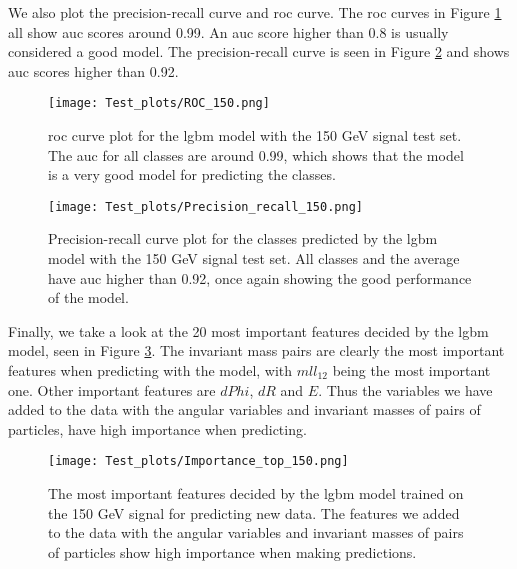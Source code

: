 \documentclass[a4paper, american, 12pt]{report}
\begin{document}
	We also plot the precision-recall curve and \acrshort{roc} curve. The \acrshort{roc} curves in Figure \ref{fig:ROCTest_150} all show \acrshort{auc} scores around 0.99. An \acrshort{auc} score higher than 0.8 is usually considered a good model. The precision-recall curve is seen in Figure \ref{fig:PrecisionRecallTest_150} and shows \acrshort{auc} scores higher than 0.92.
	\begin{figure}[h!tb]
		\centering\texttt{[image: Test\_plots/ROC\_150.png]}
		\caption[Test set \acrshort{roc} plot for the \acrshort{lgbm} model trained on the 150 GeV signal.]{\acrshort{roc} curve plot for the \acrshort{lgbm} model with the 150 GeV signal test set. The \acrshort{auc} for all classes are around 0.99, which shows that the model is a very good model for predicting the classes. \label{fig:ROCTest_150}}
	\end{figure}
	\begin{figure}[h!tb]
		\centering\texttt{[image: Test\_plots/Precision\_recall\_150.png]}
		\caption[Test set precision-recall plot for the \acrshort{lgbm} model trained on the 150 GeV signal.]{Precision-recall curve plot for the classes predicted by the \acrshort{lgbm} model with the 150 GeV signal test set. All classes and the average have \acrshort{auc} higher than 0.92, once again showing the good performance of the model. \label{fig:PrecisionRecallTest_150}}
	\end{figure}
	
	Finally, we take a look at the 20 most important features decided by the \acrshort{lgbm} model, seen in Figure \ref{fig:ImpTop_150}. The invariant mass pairs are clearly the most important features when predicting with the model, with $mll_{12}$ being the most important one. Other important features are $dPhi$, $dR$ and $E$. Thus the variables we have added to the data with the angular variables and invariant masses of pairs of particles, have high importance when predicting.
	\begin{figure}[htb!]
		\centering\texttt{[image: Test\_plots/Importance\_top\_150.png]}
		\caption[Test set most important features of the \acrshort{lgbm} model trained on the 150 GeV signal.]{The most important features decided by the \acrshort{lgbm} model trained on the 150 GeV signal for predicting new data. The features we added to the data with the angular variables and invariant masses of pairs of particles show high importance when making predictions. \label{fig:ImpTop_150}}
	\end{figure}
\end{document}
